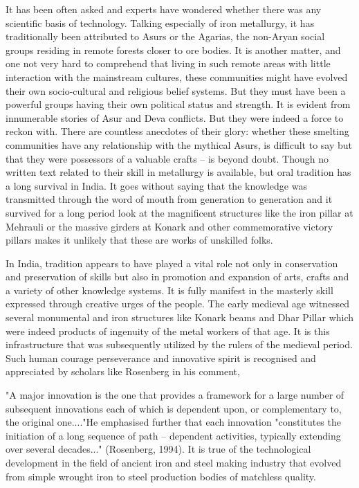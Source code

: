 It has been often asked and experts have wondered whether there was any scientific basis of technology. Talking especially of iron metallurgy, it has traditionally been attributed to Asurs or the Agarias, the non-Aryan social groups residing in remote forests closer to ore bodies. It is another matter, and one not very hard to comprehend that living in such remote areas with little interaction with the mainstream cultures, these communities might have evolved their own socio-cultural and religious belief systems. But they must have been a powerful groups having their own political status and strength. It is evident from innumerable stories of Asur and Deva conflicts. But they were indeed a force to reckon with. There are countless anecdotes of their glory: whether these smelting communities have any relationship with the mythical Asurs, is difficult to say but that they were possessors of a valuable crafts – is beyond doubt. Though no written text related to their skill in metallurgy is available, but oral tradition has a long survival in India. It goes without saying that the knowledge was transmitted through the word of mouth from generation to generation and it survived for a long period look at the magnificent structures like the iron pillar at Mehrauli or the massive girders at Konark and other commemorative victory pillars makes it unlikely that these are works of unskilled folks.

In India, tradition appears to have played a vital role not only in conservation and preservation of skills but also in promotion and expansion of arts, crafts and a variety of other knowledge systems. It is fully manifest in the masterly skill expressed through creative urges of the people. The early medieval age witnessed several monumental and iron structures like Konark beams and Dhar Pillar which were indeed products of ingenuity of the metal workers of that age. It is this infrastructure that was subsequently utilized by the rulers of the medieval period. Such human courage perseverance and innovative spirit is recognised and appreciated by scholars like Rosenberg in his comment,

"A major innovation is the one that provides a framework for a large number of subsequent innovations each of which is dependent upon, or complementary to, the original one...."He emphasised further that each innovation "constitutes the initiation of a long sequence of path – dependent activities, typically extending over several decades..." (Rosenberg, 1994). It is true of the technological development in the field of ancient iron and steel making industry that evolved from simple wrought iron to steel production bodies of matchless quality.

